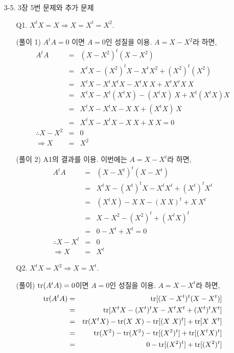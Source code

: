 \documentclass[fleqn, a4paper]{article}
\begin{document}


\begin{enumerate}
\item[3-5.] 3장 5번 문제와 추가 문제 
\begin{enumerate}
\item[Q1.] $X^tX = X\Rightarrow X = X^t = X^2$.
\item[(풀이 1)] $A^tA = 0$ 이면 $A = 0$인 성질을 이용. $A=X-X^2$라 하면,
\begin{eqnarray*}
A^tA&=&(X-X^2)^t(X-X^2)\\
      &=&X^tX-(X^2)^tX - X^tX^2 + (X^2)^t(X^2)\\
      &=&X^tX-X^tX^tX-X^tX\ X + X^tX^tX\ X\\
      &=&X^tX-X^t(X^tX)-(X^tX)\ X + X^t(X^tX)X\\
      &=&X^tX-X^tX-X\ X + (X^tX)\ X\\
      &=&X^tX-X^tX-X\ X + X\ X = 0\\
      \therefore X-X^2&=&0\\
      \Rightarrow X&=&X^2 
\end{eqnarray*}
\item[(풀이 2)] A1의 결과를 이용. 이번에는 $A=X-X^t$라 하면,
\begin{eqnarray*}
A^tA &=&(X-X^t)^t(X-X^t)\\ 
      &=&X^tX-(X^t)^tX - X^tX^t + (X^t)^tX^t\\
      &=&(X^tX)-X\ X - (X\ X)^t + X\ X^t\\
      &=&X-X^2-(X^2)^t + (X^tX)^t\\
      &=&0-X^t + X^t = 0\\
      \therefore X-X^t&=&0\\
      \Rightarrow X&=&X^t 
\end{eqnarray*}
\item[Q2.] $X^tX = X^2\Rightarrow X = X^t$.
\item[(풀이)] ${\rm tr}(A^tA)=0$이면 $A=0$인 성질을 이용. $A=X-X^t$라 하면,
\begin{eqnarray*}
{\rm tr}(A^tA)&=&{\rm tr}[(X-X^t)^t(X-X^t)]\\ 
      &=&{\rm tr}[X^tX-(X^t)^tX - X^tX^t + (X^t)^tX^t]\\
      &=&{\rm tr}(X^tX)-{\rm tr}(X\ X) - {\rm tr}[(X\ X)^t] + {\rm tr}[X\ X^t]\\
      &=&{\rm tr}(X^2)-{\rm tr}(X^2)-{\rm tr}[(X^2)^t] + {\rm tr}[(X^tX)^t]\\
      &=&0-{\rm tr}[(X^2)^t] + {\rm tr}[(X^2)^t]\\

\end{eqnarray*}
\end{enumerate}
\end{enumerate}
\end{document}
